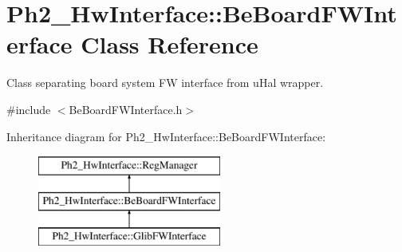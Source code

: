 \hypertarget{class_ph2___hw_interface_1_1_be_board_f_w_interface}{\section{Ph2\-\_\-\-Hw\-Interface\-:\-:Be\-Board\-F\-W\-Interface Class Reference}
\label{class_ph2___hw_interface_1_1_be_board_f_w_interface}
}


Class separating board system F\-W interface from u\-Hal wrapper.  




{\ttfamily \#include $<$Be\-Board\-F\-W\-Interface.\-h$>$}

Inheritance diagram for Ph2\-\_\-\-Hw\-Interface\-:\-:Be\-Board\-F\-W\-Interface\-:\begin{figure}[H]
\begin{center}
\leavevmode
\includegraphics[height=3.000000cm]{class_ph2___hw_interface_1_1_be_board_f_w_interface}
\end{center}
\end{figure}
